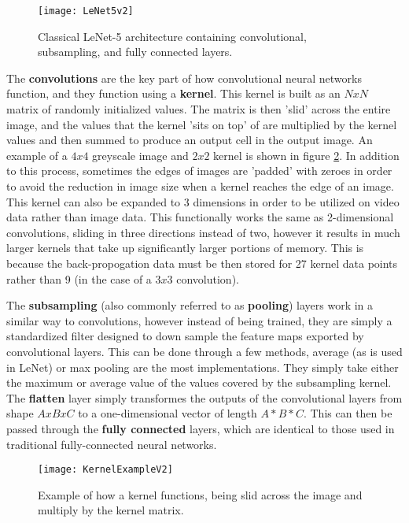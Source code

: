 \begin{figure}[ht]
	\texttt{[image: LeNet5v2]}
	\centering
	\caption{Classical LeNet-5 architecture \cite{lenet5} containing convolutional, subsampling, and fully connected layers.}
	\label{fig:lenet5}
\end{figure}

The \textbf{convolutions} are the key part of how convolutional neural networks function, and they function using a \textbf{kernel}. This kernel is built as an $NxN$ matrix of randomly initialized values. The matrix is then 'slid' across the entire image, and the values that the kernel 'sits on top' of are multiplied by the kernel values and then summed to produce an output cell in the output image. An example of a $4x4$ greyscale image and $2x2$ kernel is shown in figure \ref{fig:kernel-example}. In addition to this process, sometimes the edges of images are 'padded' with zeroes in order to avoid the reduction in image size when a kernel reaches the edge of an image. This kernel can also be expanded to 3 dimensions in order to be utilized on video data rather than image data. This functionally works the same as 2-dimensional convolutions, sliding in three directions instead of two, however it results in much larger kernels that take up significantly larger portions of memory. This is because the back-propogation data must be then stored for 27 kernel data points rather than 9 (in the case of a $3x3$ convolution).

The \textbf{subsampling} (also commonly referred to as \textbf{pooling}) layers work in a similar way to convolutions, however instead of being trained, they are simply a standardized filter designed to down sample the feature maps exported by convolutional layers. This can be done through a few methods, average (as is used in LeNet) or max pooling are the most implementations. They simply take either the maximum or average value of the values covered by the subsampling kernel. The \textbf{flatten} layer simply transformes the outputs of the convolutional layers from shape $AxBxC$ to a one-dimensional vector of length $A*B*C$. This can then be passed through the \textbf{fully connected} layers, which are identical to those used in traditional fully-connected neural networks.

\begin{figure}[ht]
	\texttt{[image: KernelExampleV2]}
	\centering
	\caption{Example of how a kernel functions, being slid across the image and multiply by the kernel matrix.}
	\label{fig:kernel-example}
\end{figure}

